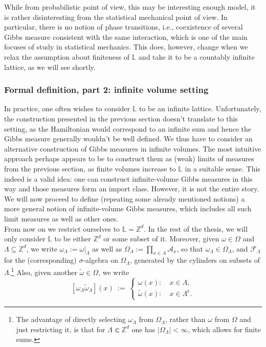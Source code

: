 \documentclass[12pt]{article}
\newcommand{\A}{\mathcal{A}}
\newcommand{\F}{\mathcal{F}}
\renewcommand{\L}{\mathbb{L}}
\newcommand{\Z}{\mathbb{Z}}
\newcommand{\1}{\mathbbm{1}}
\renewcommand{\c}{\mathsf{c}}
\newcommand{\5}{\vspace{0.5cm}}
\renewcommand{\tilde}{\widetilde}
\theoremstyle{definition}
\begin{document}
While from probabilistic point of view, this may be interesting enough model, it is rather disinteresting from the statistical mechanical point of view. In particular, there is no notion of phase transitions, i.e., coexistence of several Gibbs measure consistent with the same interaction, which is one of the main focuses of study in statistical mechanics. This does, however, change when we relax the assumption about finiteness of $\L$ and take it to be a countably infinite lattice, as we will see shortly.


\subsubsection{Formal definition, part 2: infinite volume setting}

In practice, one often wishes to consider $\L$ to be an infinite lattice. Unfortunately, the construction presented in the previous section doesn't translate to this setting, as the Hamiltonian would correspond to an infinite sum and hence the Gibbs measure generally wouldn't be well defined. We thus have to consider an alternative construction of Gibbs measures in infinite volumes. The most intuitive approach perhaps appears to be to construct them as (weak) limits of measures from the previous section, as finite volumes increase to $\L$ in a suitable sense. This indeed is a valid idea: one can construct infinite-volume Gibbs measures in this way and those measures form an import class. However, it is not the entire story. We will now proceed to define (repeating some already mentioned notions) a more general notion of infinite-volume Gibbs measures, which includes all such limit measures as well as other ones. \\

From now on we restrict ourselves to $\L=\Z^d$. In the rest of the thesis, we will only consider $\L$ to be either $\Z^d$ or some subset of it. Moreover, given $\omega\in\Omega$ and $\Lambda\subseteq\Z^d$, we write $\omega_\Lambda:=\omega|_\Lambda$ as well as $\Omega_\Lambda:=\prod_{x\in\Lambda}\A_x$, so that $\omega_\Lambda\in\Omega_\Lambda$, and $\F_\Lambda$ for the (corresponding) $\sigma$-algebra on $\Omega_\Lambda$, generated by the cylinders on subsets of $\Lambda$.\footnote{The advantage of directly selecting $\omega_\Lambda$ from $\Omega_\Lambda$, rather than $\omega$ from $\Omega$ and just restricting it, is that for $\Lambda\Subset\Z^d$ one has $|\Omega_\Lambda|<\infty$, which allows for finite sums.} Also, given another $\tilde{\omega}\in\Omega$, we write $$[\omega_\Lambda\tilde{\omega}_\Lambda](x) ~:=~ \begin{cases}
\omega(x): ~&x\in\Lambda,\\
\tilde{\omega}(x): ~&x\in\Lambda^\c.
\end{cases}$$
\end{document}
